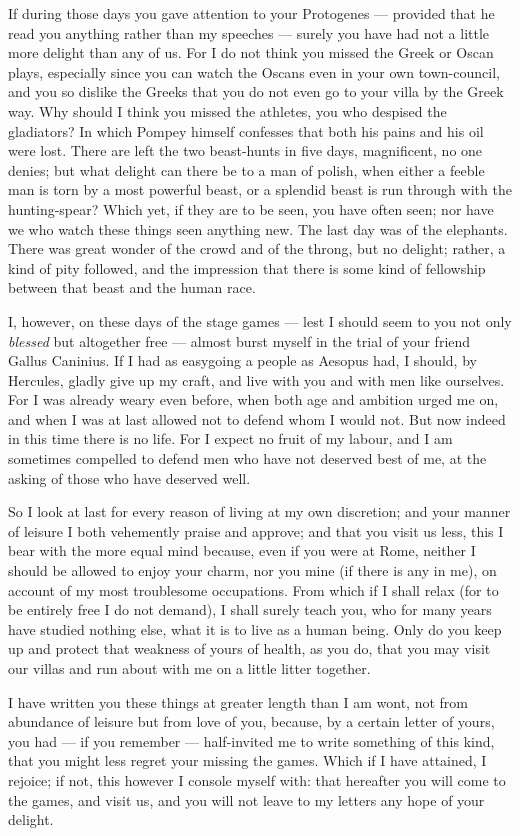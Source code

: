  If during those days you gave attention to your Protogenes — provided that he read you anything rather than my speeches — surely you have had not a little more delight than any of us. For I do not think you missed the Greek or Oscan plays, especially since you can watch the Oscans even in your own town-council, and you so dislike the Greeks that you do not even go to your villa by the Greek way. Why should I think you missed the athletes, you who despised the gladiators? In which Pompey himself confesses that both his pains and his oil were lost. There are left the two beast-hunts in five days, magnificent, no one denies; but what delight can there be to a man of polish, when either a feeble man is torn by a most powerful beast, or a splendid beast is run through with the hunting-spear? Which yet, if they are to be seen, you have often seen; nor have we who watch these things seen anything new. The last day was of the elephants. There was great wonder of the crowd and of the throng, but no delight; rather, a kind of pity followed, and the impression that there is some kind of fellowship between that beast and the human race.

 I, however, on these days of the stage games — lest I should seem to you not only \textit{blessed} but altogether free — almost burst myself in the trial of your friend Gallus Caninius. If I had as easygoing a people as Aesopus had, I should, by Hercules, gladly give up my craft, and live with you and with men like ourselves. For I was already weary even before, when both age and ambition urged me on, and when I was at last allowed not to defend whom I would not. But now indeed in this time there is no life. For I expect no fruit of my labour, and I am sometimes compelled to defend men who have not deserved best of me, at the asking of those who have deserved well.

 So I look at last for every reason of living at my own discretion; and your manner of leisure I both vehemently praise and approve; and that you visit us less, this I bear with the more equal mind because, even if you were at Rome, neither I should be allowed to enjoy your charm, nor you mine (if there is any in me), on account of my most troublesome occupations. From which if I shall relax (for to be entirely free I do not demand), I shall surely teach you, who for many years have studied nothing else, what it is to live as a human being. Only do you keep up and protect that weakness of yours of health, as you do, that you may visit our villas and run about with me on a little litter together.

 I have written you these things at greater length than I am wont, not from abundance of leisure but from love of you, because, by a certain letter of yours, you had — if you remember — half-invited me to write something of this kind, that you might less regret your missing the games. Which if I have attained, I rejoice; if not, this however I console myself with: that hereafter you will come to the games, and visit us, and you will not leave to my letters any hope of your delight.
